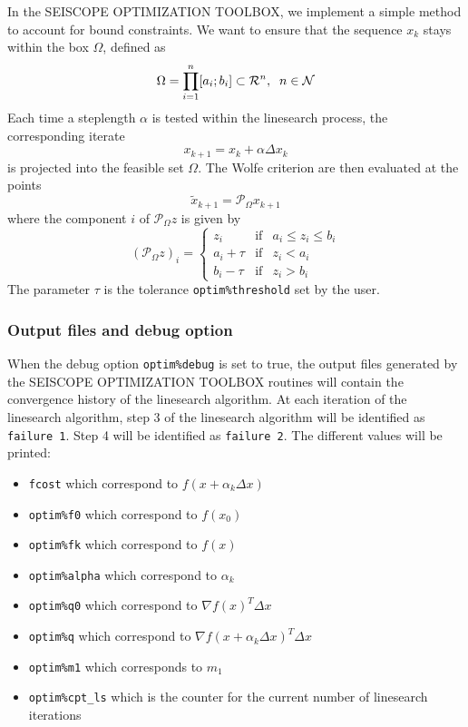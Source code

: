 \documentclass[a4paper,twoside,final,onecolumn,11pt,openright]{article}
\def \mathbb #1{{\cal #1}}
\begin{document}
In the SEISCOPE OPTIMIZATION TOOLBOX, we implement a simple method to account for bound constraints. We want to ensure that the sequence $x_k$ stays within the box $\Omega$, defined as 
\begin{equation}
 \Omega=\prod_{i=1}^{n}[a_i; b_i] \subset \mathbb{R}^n, \;\; n \in \mathbb{N}
\end{equation}
Each time a steplength $\alpha$ is tested within the linesearch process, the corresponding iterate 
\begin{equation}
 x_{k+1}=x_{k}+\alpha \Delta x_{k}
\end{equation}
is projected into the feasible set $\Omega$. The Wolfe criterion are then evaluated at the points
\begin{equation}
 \widetilde{x}_{k+1}=\mathcal{P}_{\Omega}x_{k+1}
\end{equation}
where the component $i$ of $\mathcal{P}_{\Omega}z$ is given by 
\begin{equation}
 \left(\mathcal{P}_{\Omega}z\right)_i=
\left\{
\begin{array}{ccc}
 z_{i} &\textrm{if}& a_i \leq z_i \leq b_i
 \\
 a_i+\tau &\textrm{if}& z_i < a_i
\\
 b_i-\tau &\textrm{if}& z_i > b_i
\end{array}
\right.
\end{equation}
The parameter $\tau$ is the tolerance \texttt{optim\%threshold} set by the user.

\subsubsection{Output files and debug option}
\label{ls_info}
When the debug option \texttt{optim\%debug} is set to true, the output files generated by the SEISCOPE OPTIMIZATION TOOLBOX routines 
will contain the convergence history of the linesearch algorithm. At each iteration of the linesearch algorithm, step 3 of the linesearch algorithm will be identified as \texttt{failure 1}. Step 4 will be identified as \texttt{failure 2}. The different values will be printed:
\begin{itemize}
\item \texttt{fcost} which correspond to $f(x+\alpha_k \Delta x)$
\item \texttt{optim\%f0} which correspond to $f(x_0)$
 \item \texttt{optim\%fk} which correspond to $f(x)$
 \item \texttt{optim\%alpha} which correspond to $\alpha_k$
\item \texttt{optim\%q0} which correspond to $\nabla f(x)^{T}\Delta x$
\item \texttt{optim\%q} which correspond to $\nabla f(x+\alpha_k \Delta x)^{T}\Delta x$
\item \texttt{optim\%m1} which corresponds to $m_1$
\item \texttt{optim\%cpt\_ls} which is the counter for the current number of linesearch iterations
\end{itemize}
\end{document}

